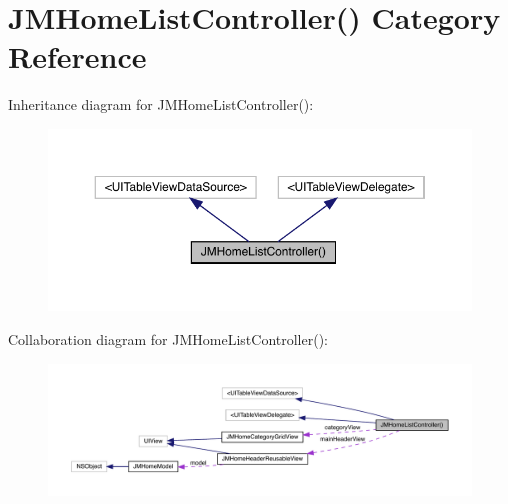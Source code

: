 \hypertarget{category_j_m_home_list_controller_07_08}{}\section{J\+M\+Home\+List\+Controller() Category Reference}
\label{category_j_m_home_list_controller_07_08}


Inheritance diagram for J\+M\+Home\+List\+Controller()\+:\nopagebreak
\begin{figure}[H]
\begin{center}
\leavevmode
\includegraphics[width=350pt]{category_j_m_home_list_controller_07_08__inherit__graph}
\end{center}
\end{figure}


Collaboration diagram for J\+M\+Home\+List\+Controller()\+:\nopagebreak
\begin{figure}[H]
\begin{center}
\leavevmode
\includegraphics[width=350pt]{category_j_m_home_list_controller_07_08__coll__graph}
\end{center}
\end{figure}
